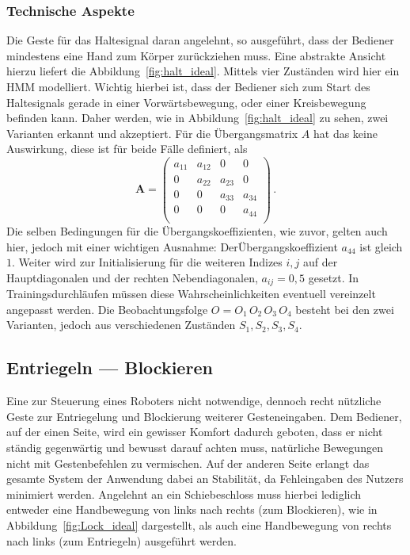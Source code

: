 \subsubsection{Technische Aspekte}
Die Geste f\"ur das Haltesignal daran angelehnt, so ausgef\"uhrt, dass der Bediener mindestens eine Hand zum K\"orper zur\"uckziehen muss. Eine abstrakte Ansicht hierzu liefert die Abbildung~\ref{fig:halt_ideal}. Mittels vier Zust\"anden wird hier ein \acrshort{HMM} modelliert.
\newline
Wichtig hierbei ist, dass der Bediener sich zum Start des Haltesignals gerade in einer Vorw\"artsbewegung, oder einer Kreisbewegung befinden kann. Daher werden, wie in Abbildung~\ref{fig:halt_ideal} zu sehen, zwei Varianten erkannt und akzeptiert. F\"ur die \"Ubergangsmatrix $A$ hat das keine Auswirkung, diese ist f\"ur beide F\"alle definiert, als
\begin{equation}
\mathbf{A} = 
\begin{pmatrix}
a_{11} & a_{12} & 0 & 0\\
0 & a_{22} & a_{23} & 0\\
0 & 0 & a_{33} & a_{34}\\
0 & 0 & 0 & a_{44} \\
\end{pmatrix} \, .
\end{equation}
Die selben Bedingungen f\"ur die \"Ubergangskoeffizienten, wie zuvor, gelten auch hier, jedoch mit einer wichtigen Ausnahme: Der\"Ubergangskoeffizient $a_{44}$ ist gleich $1$. Weiter wird zur Initialisierung f\"ur die weiteren Indizes $i, j$ auf der Hauptdiagonalen und der rechten Nebendiagonalen, $a_{ij} = 0,5$ gesetzt. In Trainingsdurchl\"aufen m\"ussen diese Wahrscheinlichkeiten eventuell vereinzelt angepasst werden. Die Beobachtungsfolge $O = O_1\, O_2\, O_3\, O_4$ besteht bei den zwei Varianten, jedoch aus verschiedenen Zust\"anden $S_1, S_2, S_3, S_4$.

\subsection{Entriegeln --- Blockieren}
\label{subsec:gesture-lock-unlock}

Eine zur Steuerung eines Roboters nicht notwendige, dennoch recht n\"utzliche Geste zur Entriegelung und Blockierung weiterer Gesteneingaben. Dem Bediener, auf der einen Seite, wird ein gewisser Komfort dadurch geboten, dass er nicht st\"andig gegenw\"artig und bewusst darauf achten muss, nat\"urliche Bewegungen nicht mit Gestenbefehlen zu vermischen. Auf der anderen Seite erlangt das gesamte System der Anwendung dabei an Stabilit\"at, da Fehleingaben des Nutzers minimiert werden.
\newline
Angelehnt an ein Schiebeschloss muss hierbei lediglich entweder eine Handbewegung von links nach rechts (zum Blockieren), wie in Abbildung~\ref{fig:Lock_ideal} dargestellt, als auch eine Handbewegung von rechts nach links (zum Entriegeln) ausgef\"uhrt werden.

